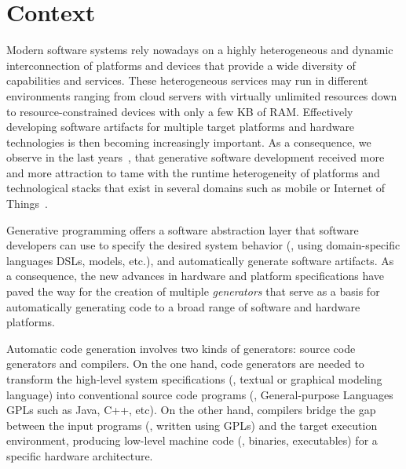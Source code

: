 

\section{Context}
Modern software systems rely nowadays on a highly heterogeneous and dynamic interconnection of platforms and devices that provide a wide diversity of capabilities and services. These heterogeneous services may run in different environments ranging from cloud servers with virtually unlimited resources down to resource-constrained devices with only a few KB of RAM. Effectively developing software artifacts for multiple target platforms and hardware technologies is then becoming increasingly important. As a consequence, we observe in the last years~\cite{Czarnecki:2000:GPM:345203}, that generative software development received more and more attraction to tame with the runtime heterogeneity of platforms and technological stacks that exist in several domains such as mobile or Internet of Things~\cite{betz2011improving}.

Generative programming offers a software abstraction layer that software developers can use to specify the desired system behavior (\eg, using domain-specific languages DSLs, models, etc.), and automatically generate software artifacts. As a consequence, the new advances in hardware and platform specifications have paved the way for the creation of multiple \textit{generators} that serve as a basis for automatically generating code to a broad range of software and hardware platforms. 


Automatic code generation involves two kinds of generators: source code generators and compilers.
On the one hand, code generators are needed to transform the high-level system specifications (\eg, textual or graphical modeling language) into conventional source code programs (\eg, General-purpose Languages GPLs such as Java, C++, etc). 
On the other hand, compilers bridge the gap between the input programs (\ie, written using GPLs) and the target execution environment, producing low-level machine code (\ie, binaries, executables) for a specific hardware architecture.


